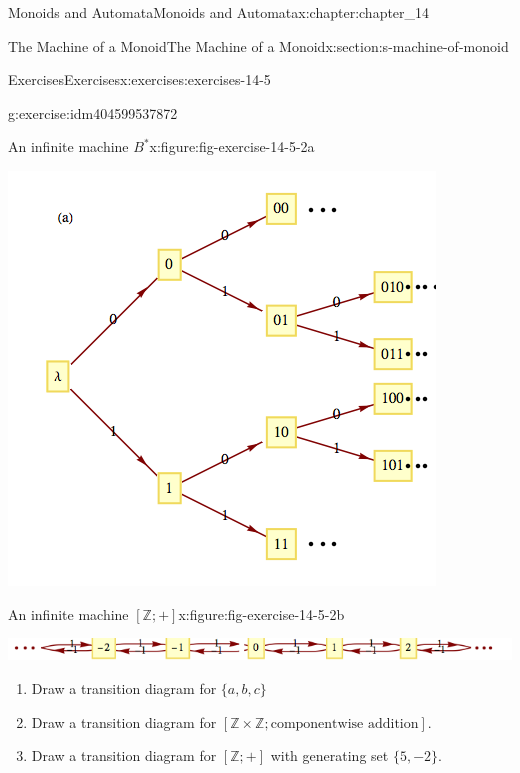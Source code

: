 \documentclass[twoside,10pt,]{book}
\numberwithin{equation}{section}
\begin{document}
\begin{chapterptx}{Monoids and Automata}{}{Monoids and Automata}{}{}{x:chapter:chapter_14}
\begin{sectionptx}{The Machine of a Monoid}{}{The Machine of a Monoid}{}{}{x:section:s-machine-of-monoid}
\begin{exercises-subsection}{Exercises}{}{Exercises}{}{}{x:exercises:exercises-14-5}
\begin{divisionexercise}{2}{}{}{g:exercise:idm404599537872}
\begin{figureptx}{An infinite machine \(B^*\)}{x:figure:fig-exercise-14-5-2a}{}
\begin{image}{0.15}{0.7}{0.15}
\includegraphics[width=\linewidth]{images/fig-exercise-14-5-2a.png}
\end{image}%
\tcblower
\end{figureptx}%
\begin{figureptx}{An infinite machine \([\mathbb{Z};+]\)}{x:figure:fig-exercise-14-5-2b}{}%
\begin{image}{0.15}{0.7}{0.15}%
\includegraphics[width=\linewidth]{images/fig-exercise-14-5-2b.png}
\end{image}%
\tcblower
\end{figureptx}%
%
\begin{enumerate}[label=(\alph*)]
\item{}Draw a transition diagram for \(\{a, b, c\}\)%
\item{}Draw a transition diagram for \([\mathbb{Z}\times \mathbb{Z};\textrm{componentwise addition}]\).%
\item{}Draw a transition diagram for \([\mathbb{Z};+]\) with generating set \(\{5,-2\}\).%
\end{enumerate}
%
\end{divisionexercise}%
\end{exercises-subsection}
\end{sectionptx}
\end{chapterptx}
\end{document}
